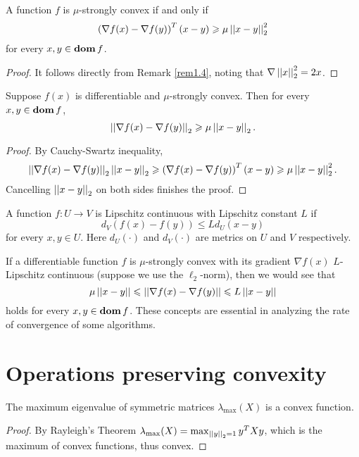 \documentclass[12pt]{article}
\begin{document}
\begin{proposition}
    A function \(f\) is \(\mu\)-strongly convex if and only if
    \[\left(\nabla f(x)-\nabla f(y)\right)^T(x-y)\geqslant\mu\left|\left|x-y\right|\right|_2^2\]
    for every \(x,y\in\operatorname{\mathbf{dom}} f\).
\end{proposition}
\begin{proof}
    It follows directly from Remark \ref{rem1.4}, noting that \(\nabla\left|\left|x\right|\right|_2^2=2x\).
\end{proof}

\begin{proposition}
    Suppose \(f(x)\) is differentiable and \(\mu\)-strongly convex. Then for every \(x,y\in\operatorname{\mathbf{dom}} f\),
    \[\left|\left|\nabla f(x)-\nabla f(y)\right|\right|_2\geqslant\mu\left|\left|x-y\right|\right|_2.\]
\end{proposition}
\begin{proof}
    By Cauchy-Swartz inequality,
    \[\left|\left|\nabla f(x)-\nabla f(y)\right|\right|_2\left|\left|x-y\right|\right|_2\geqslant\left(\nabla f(x)-\nabla f(y)\right)^T(x-y)\geqslant\mu\left|\left|x-y\right|\right|_2^2.\]
    Cancelling \(\left|\left|x-y\right|\right|_2\) on both sides finishes the proof.
\end{proof}

\begin{remark}[Lipschitz]
    A function \(f:U\to V\) is \textnormal{Lipschitz continuous} with \textnormal{Lipschitz constant} \(L\) if
    \[d_V\left(f(x)-f(y)\right)\leqslant Ld_U(x-y)\]
    for every \(x,y\in U\). Here \(d_U(\cdot)\) and \(d_V(\cdot)\) are metrics on \(U\) and \(V\) respectively.
\end{remark}

If a differentiable function \(f\) is \(\mu\)-strongly convex with its gradient \(\nabla f(x)\) \(L\)-Lipschitz continuous (suppose we use the \(\ell_2\)-norm), then we would see that
\[\mu\left|\left|x-y\right|\right|\leqslant\left|\left|\nabla f(x)-\nabla f(y)\right|\right|\leqslant L\left|\left|x-y\right|\right|\]
holds for every \(x,y\in\operatorname{\mathbf{dom}} f\). These concepts are essential in analyzing the rate of convergence of some algorithms.

\section{Operations preserving convexity}

\begin{proposition}
    The maximum eigenvalue of symmetric matrices \(\lambda_{\max}(X)\) is a convex function.
\end{proposition}
\begin{proof}
    By Rayleigh's Theorem \(\lambda_{\max}(X)=\max_{\left|\left|y\right|\right|_2=1}y^TXy\), which is the maximum of convex functions, thus convex.
\end{proof}
\end{document}
